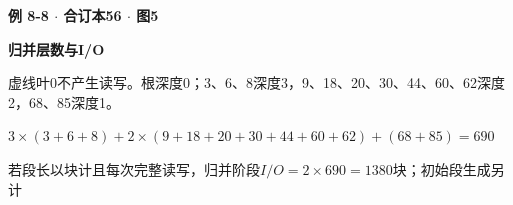 {\color{ink}\bfseries 例 8-8 \(\cdot \) 合订本56 \(\cdot \) 图5}\par \textbf{归并层数与I/\allowbreak{}O}\par\vspace{2bp}虚线叶0不产生读写。根深度0；3、6、8深度3，9、18、20、30、44、60、62深度2，68、85深度1。\par \(3\times (3+\allowbreak{}6+\allowbreak{}8)+\allowbreak{}2\times (9+\allowbreak{}18+\allowbreak{}20+\allowbreak{}30+\allowbreak{}44+\allowbreak{}60+\allowbreak{}62)+\allowbreak{}(68+\allowbreak{}85)=\allowbreak{}690\)\par 若段长以块计且每次完整读写，归并阶段\(I/\allowbreak{}O=\allowbreak{}2\times 690=\allowbreak{}1380\)块；初始段生成另计
